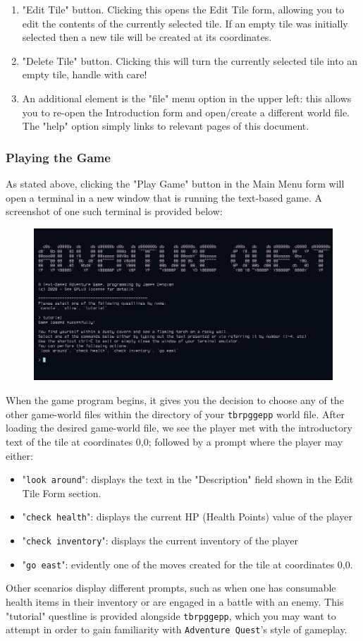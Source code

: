 \documentclass[class=article,crop=false]{standalone} \usepackage[margin=1in,headheight=57pt,headsep=0.1in]{geometry}
\begin{document}
\begin{enumerate}
\begin{itemize}
		\end{itemize}
	\item "Edit Tile" button. Clicking this opens the Edit Tile form, allowing you to edit the contents of the currently selected tile. If an empty tile was initially selected then a new tile will be created at its coordinates.
	\item "Delete Tile" button. Clicking this will turn the currently selected tile into an empty tile, handle with care!
	\item An additional element is the "file" menu option in the upper left: this allows you to re-open the Introduction form and open/create a different world file. The "help" option simply links to relevant pages of this document.
\end{enumerate}
\subsubsection{Playing the Game}
As stated above, clicking the "Play Game" button in the Main Menu form will open a terminal in a new window that is running the text-based game. A screenshot of one such terminal is provided below:
\begin{figure}[H]
	\centering
	\includegraphics[width=1.0\textwidth]{./gameplay.png}
\end{figure}
When the game program begins, it gives you the decision to choose any of the other game-world files within the directory of your \texttt{tbrpggepp} world file. After loading the desired game-world file, we see the player met with the introductory text of the tile at coordinates 0,0; followed by a prompt where the player may either:
\begin{itemize}
	\item "\texttt{look around}": displays the text in the "Description" field shown in the Edit Tile Form section.
	\item "\texttt{check health}": displays the current HP (Health Points) value of the player
	\item "\texttt{check inventory}": displays the current inventory of the player
	\item "\texttt{go east}": evidently one of the moves created for the tile at coordinates 0,0.
\end{itemize}
Other scenarios display different prompts, such as when one has consumable health items in their inventory or are engaged in a battle with an enemy. This "tutorial" questline is provided alongside \texttt{tbrpggepp}, which you may want to attempt in order to gain familiarity with \texttt{Adventure Quest}'s style of gameplay.
\end{document}

